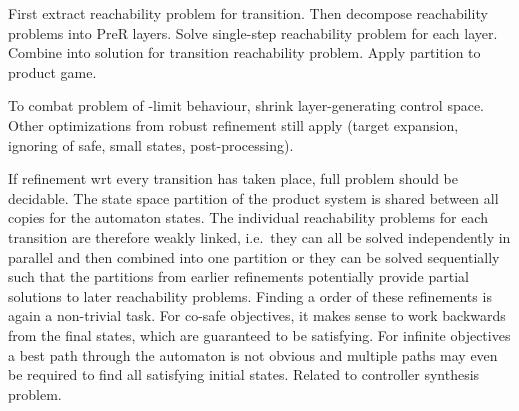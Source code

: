     First extract reachability problem for transition.
    Then decompose reachability problems into PreR layers.
    Solve single-step reachability problem for each layer.
    Combine into solution for transition reachability problem.
    Apply partition to product game.

    To combat problem of \epsilon-limit behaviour, shrink layer-generating control space.
    Other optimizations from robust refinement still apply (target expansion, ignoring of safe, small states, post-processing).

\stopsubsection


\startsubsection[title={Transition Selection},reference=refinement-transition-selection]

    If refinement wrt every transition has taken place, full problem should be decidable.
    The state space partition of the product system is shared between all copies for the automaton states.
    The individual reachability problems for each transition are therefore weakly linked, i.e.\ they can all be solved independently in parallel and then combined into one partition or they can be solved sequentially such that the partitions from earlier refinements potentially provide partial solutions to later reachability problems.
    Finding a  order of these refinements is again a non-trivial task.
    For co-safe objectives, it makes sense to work backwards from the final states, which are guaranteed to be satisfying.
    For infinite objectives a best path through the automaton is not obvious and multiple paths may even be required to find all satisfying initial states.
    Related to controller synthesis problem.

\stopsubsection

